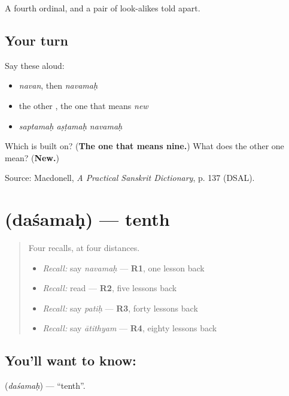 \begin{grammarlens}[title={What you've built}]
A fourth ordinal, and a pair of look-alikes told apart.
\end{grammarlens}

\subsection*{Your turn}
Say these aloud:

\begin{itemize}
\raggedright
  \item \emph{navan}, then \emph{navamaḥ}
  \item the other \textbf{}, the one that means \emph{new}
  \item \emph{saptamaḥ aṣṭamaḥ navamaḥ}
\end{itemize}

\begin{tcolorbox}[breakable,colback=teal!4,colframe=teal!35!black,title={Before you move on}]
Which \textbf{} is \textbf{} built on? (\textbf{The one that means nine.}) What does the other one mean? (\textbf{New.})

Source: Macdonell, \emph{A Practical Sanskrit Dictionary}, p. 137 (DSAL).
\end{tcolorbox}
\section[\texorpdfstring{\sk{दशमः} (daśamaḥ)}{दशमः (daśamaḥ)}]{ (daśamaḥ) — tenth}

\label{lesson:SA-C62-tenth}



\begin{quote}
Four recalls, at four distances.

\begin{itemize}
\raggedright
  \item \emph{Recall:} say \emph{navamaḥ} — \textbf{R1}, one lesson back
  \item \emph{Recall:} read \textbf{} — \textbf{R2}, five lessons back
  \item \emph{Recall:} say \emph{patiḥ} — \textbf{R3}, forty lessons back
  \item \emph{Recall:} say \emph{ātithyam} — \textbf{R4}, eighty lessons back
\end{itemize}
\end{quote}

\subsection*{You'll want to know: }
\textbf{} (\emph{daśamaḥ}) — \textquotedblleft{}tenth\textquotedblright{}.

